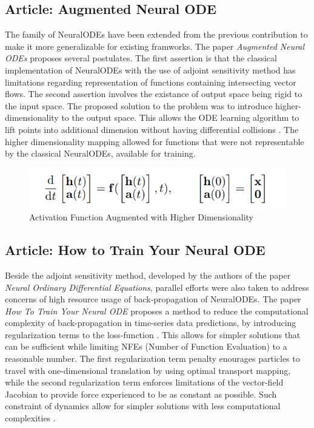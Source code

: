 \documentclass{article}
\begin{document}
\subsection{Article: Augmented Neural ODE}

The family of NeuralODEs have been extended from the previous contribution to make it more generalizable for existing framworks.
The paper \textit{Augmented Neural ODEs} proposes several postulates. The first assertion is that the classical implementation
of NeuralODEs with the use of adjoint sensitivity method has limitations regarding representation of functions containing intersecting vector flows. The second
assertion involves the existance of output space being rigid to the input space. The proposed solution to the problem was to introduce
higher-dimensionality to the output space. This allows the ODE learning algorithm to lift points into additional dimension without having
differential collisions \cite{19Dupont}. The higher dimensionality mapping allowed for functions that were not representable by the classical
NeuralODEs, available for training.

\begin{figure}[H]
   \centering
   \includegraphics[width=\columnwidth]
   {./Augmented_ODe.png}
   \caption{Activation Function Augmented with Higher Dimensionality \cite{19Dupont}}
   \label{fig:my_label}
\end{figure}


\subsection{Article: How to Train Your Neural ODE}

Beside the adjoint sensitivity method, developed by the authors of the paper \textit{Neural Ordinary Differential Equations},
parallel efforts were also taken to address concerns of high resource usage of back-propagation of NeuralODEs. The paper
\textit{How To Train Your Neural ODE} proposes a method to reduce the computational complexity of back-propagation
in time-series data predictions, by introducing regularization terms to the loss-function \cite{20Finlay}. This allows
for simpler solutions that can be sufficient while limiting NFEs (Number of Function Evaluation) to a reasonable number.
The first regularization term penalty enourages particles to travel with one-dimensional translation by using optimal transport
mapping, while the second regularization term enforces limitations of the vector-field Jacobian to provide force experienced
to be as constant as possible. Such constraint of dynamics allow for simpler solutions with less computational complexities \cite{20Finlay}.
\end{document}

